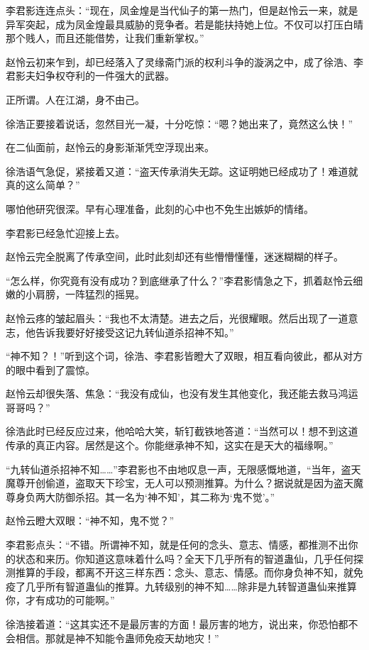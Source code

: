 \begin{this_body}
李君影连连点头：“现在，凤金煌是当代仙子的第一热门，但是赵怜云一来，就是异军突起，成为凤金煌最具威胁的竞争者。若是能扶持她上位。不仅可以打压白晴那个贱人，而且还能借势，让我们重新掌权。”

赵怜云初来乍到，却已经落入了灵缘斋门派的权利斗争的漩涡之中，成了徐浩、李君影夫妇争权夺利的一件强大的武器。

正所谓。人在江湖，身不由己。

徐浩正要接着说话，忽然目光一凝，十分吃惊：“嗯？她出来了，竟然这么快！”

在二仙面前，赵怜云的身影渐渐凭空浮现出来。

徐浩语气急促，紧接着又道：“盗天传承消失无踪。这证明她已经成功了！难道就真的这么简单？”

哪怕他研究很深。早有心理准备，此刻的心中也不免生出嫉妒的情绪。

李君影已经急忙迎接上去。

赵怜云完全脱离了传承空间，此时此刻却还有些懵懵懂懂，迷迷糊糊的样子。

“怎么样，你究竟有没有成功？到底继承了什么？”李君影情急之下，抓着赵怜云细嫩的小肩膀，一阵猛烈的摇晃。

赵怜云疼的皱起眉头：“我也不太清楚。进去之后，光很耀眼。然后出现了一道意志，他告诉我要好好接受这记九转仙道杀招神不知。”

“神不知？！”听到这个词，徐浩、李君影皆瞪大了双眼，相互看向彼此，都从对方的眼中看到了震惊。

赵怜云却很失落、焦急：“我没有成仙，也没有发生其他变化，我还能去救马鸿运哥哥吗？”

徐浩此时已经反应过来，他哈哈大笑，斩钉截铁地答道：“当然可以！想不到这道传承的真正内容。居然是这个。你能继承神不知，这实在是天大的福缘啊。”

“九转仙道杀招神不知……”李君影也不由地叹息一声，无限感慨地道，“当年，盗天魔尊开创偷道，盗取天下珍宝，无人可以预测推算。为什么？据说就是因为盗天魔尊身负两大防御杀招。其一名为‘神不知’，其二称为‘鬼不觉’。”

赵怜云瞪大双眼：“神不知，鬼不觉？”

李君影点头：“不错。所谓神不知，就是任何的念头、意志、情感，都推测不出你的状态和来历。你知道这意味着什么吗？全天下几乎所有的智道蛊仙，几乎任何探测推算的手段，都离不开这三样东西：念头、意志、情感。而你身负神不知，就免疫了几乎所有智道蛊仙的推算。九转级别的神不知……除非是九转智道蛊仙来推算你，才有成功的可能啊。”

徐浩接着道：“这其实还不是最厉害的方面！最厉害的地方，说出来，你恐怕都不会相信。那就是神不知能令蛊师免疫天劫地灾！”


\end{this_body}
